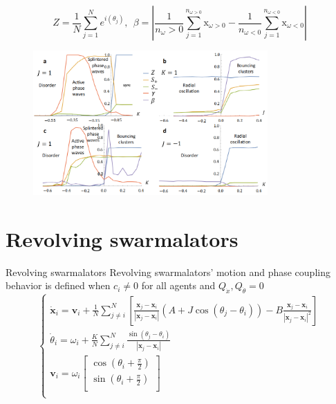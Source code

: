 \documentclass[10pt,aspectratio=43,mathserif,table]{beamer}
\begin{document}
\begin{frame}
    $$
    Z=\frac{1}{N}\sum_{j=1}^N{e^{i\left( \theta _j \right)}},\ \  \beta =\left| \frac{1}{n_{\omega}>0}\sum_{j=1}^{n_{\omega >0}}{\mathrm{x}_{\omega >0}}-\frac{1}{n_{\omega <0}}\sum_{j=1}^{n_{\omega <0}}{\mathrm{x}_{\omega <0}} \right|
    $$
    \begin{figure}
        \centering
        \includegraphics[width=0.8\textwidth]{fig3.jpg}
    \end{figure}
\end{frame}

\section{Revolving swarmalators}

\begin{frame}{Revolving swarmalators}
    Revolving swarmalators’ motion and phase coupling behavior is defined when $c_i\ne 0$ for all agents and $Q_{\dot{x}}, Q_{\dot{\theta}}=0$
    $$
    \begin{cases}
        \dot{\mathbf{x}}_i=\mathbf{v}_i+\frac{1}{N}\sum_{j\ne i}^N{\left[ \frac{\mathbf{x}_j-\mathbf{x}_i}{\left| \mathbf{x}_j-\mathbf{x}_i \right|}\left( A+J\cos \left( \theta _j-\theta _i \right) \right) -B\frac{\mathbf{x}_j-\mathbf{x}_i}{\left| \mathbf{x}_j-\mathbf{x}_i \right|^2} \right]}\\
        \dot{\theta}_i=\omega _i+\frac{K}{N}\sum_{j\ne i}^N{\frac{\sin \left( \theta _j-\theta _i \right)}{\left| \mathbf{x}_j-\mathbf{x}_i \right|}}\\
        \mathbf{v}_i=\omega _i\left[ \begin{array}{c}
        \cos \left( \theta _i+\frac{\pi}{2} \right)\\
        \sin \left( \theta _i+\frac{\pi}{2} \right)\\
    \end{array} \right]\\
    \end{cases}
    $$

\end{frame}
\end{document}
